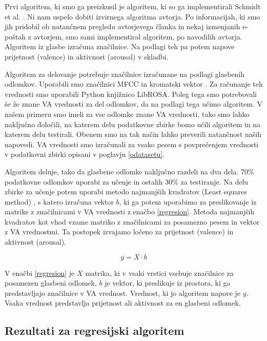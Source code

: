 \documentclass[a4paper, 12pt]{book}
\begin{document}
{Prvi algoritem, ki smo ga preizkusil je algoritem, ki so ga implementirali Schmidt et al. \cite{schmidt2009projection}. Ni nam uspelo dobiti izvirnega algoritma avtorja. Po informacijah, ki smo jih pridobil ob natančnem pregledu avtorjevega članka in nekaj izmenjanih e-poštah z avtorjem, smo sami implementiral algoritem, po navodilih avtorja. Algoritem iz glasbe izračuna značilnice. Na podlagi teh pa potem napove prijetnost (valence) in aktivnost (arousal) v skladbi. 

Algoritem za delovanje potrebuje značilnice izračunane na podlagi glasbenih odlomkov. Uporabili smo značilnici MFCC \cite{logan2000mel} in kromatski vektor \cite{Bello2005}. Za računanje teh vrednosti smo uporabili Python knjižnico LibROSA. Poleg tega smo potrebovali še že znane VA vrednosti za del odlomkov, da na podlagi tega učimo algoritem. V našem primeru smo imeli za vse odlomke znane VA vrednosti, tako smo lahko naključno določili, na katerem delu podatkovne zbirke bomo učili algoritem in na katerem delu testirali. Obenem smo na tak način lahko preverili natančnost naših napovedi. VA vrednosti smo izračunali za vsako pesem s povprečenjem vrednosti v podatkovni zbirki opisani v poglavju \ref{odatasetu}.

Algoritem deluje, tako da glasbene odlomke naključno razdeli na dva dela. 70\% podatkovne odlomkov uporabi za učenje in ostalih 30\% za testiranje. Na delu zbirke za učenje potem uporabi metodo najmanjših kvadratov (Least squares method) \cite{abdi2007method}, s katero izračuna vektor $b$, ki ga potem uporabimo za preslikovanje iz matrike z značilnicami v VA vrednosti z enačbo \ref{regresion}. Metoda najmanjših kvadratov kot vhod vzame matriko z značilnicami za posamezno pesem in vektor z VA vrednostmi. Ta postopek izvajamo ločeno za prijetnost (valence) in aktivnost (arousal).  

\begin{equation} 
\label{regresion}
y = X \cdot b
\end{equation} 

V enačbi \ref{regresion} je $X$ matrika, ki v vsaki vrstici vsebuje značilnice za posamezen glasbeni odlomek, $b$ je vektor, ki preslikuje iz prostora, ki ga predstavljajo značilnice v VA vrednost. Vrednost, ki jo algoritem napove je $y$. Vsaka vrednost predstavlja prijetnost ali aktivnost za en glasbeni odlomek. 

\subsection{Rezultati za regresijski algoritem}

}
\end{document}
